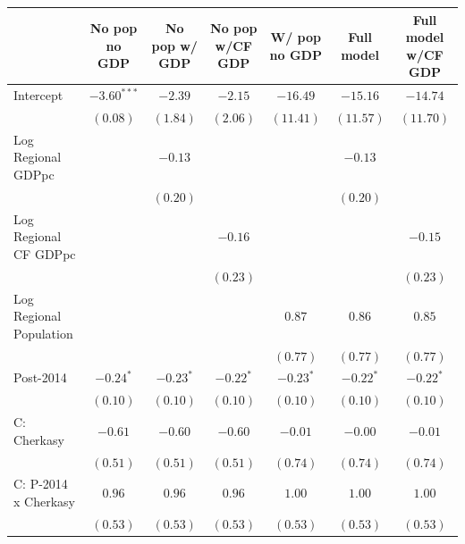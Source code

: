 
\begin{table}
\begin{center}
\begin{small}
\begin{tabular}{l c c c c c c}
\hline
 & No pop
no GDP & No pop
w/ GDP & No pop 
w/CF GDP & W/ pop
no GDP & Full model & Full model w/CF GDP \\
\hline
Intercept                   & $-3.60^{***}$ & $-2.39$       & $-2.15$       & $-16.49$     & $-15.16$     & $-14.74$     \\
                            & $(0.08)$      & $(1.84)$      & $(2.06)$      & $(11.41)$    & $(11.57)$    & $(11.70)$    \\
Log Regional GDPpc          &               & $-0.13$       &               &              & $-0.13$      &              \\
                            &               & $(0.20)$      &               &              & $(0.20)$     &              \\
Log Regional CF GDPpc       &               &               & $-0.16$       &              &              & $-0.15$      \\
                            &               &               & $(0.23)$      &              &              & $(0.23)$     \\
Log Regional Population     &               &               &               & $0.87$       & $0.86$       & $0.85$       \\
                            &               &               &               & $(0.77)$     & $(0.77)$     & $(0.77)$     \\
Post-2014                   & $-0.24^{*}$   & $-0.23^{*}$   & $-0.22^{*}$   & $-0.23^{*}$  & $-0.22^{*}$  & $-0.22^{*}$  \\
                            & $(0.10)$      & $(0.10)$      & $(0.10)$      & $(0.10)$     & $(0.10)$     & $(0.10)$     \\
C: Cherkasy                 & $-0.61$       & $-0.60$       & $-0.60$       & $-0.01$      & $-0.00$      & $-0.01$      \\
                            & $(0.51)$      & $(0.51)$      & $(0.51)$      & $(0.74)$     & $(0.74)$     & $(0.74)$     \\
C: P-2014 x Cherkasy        & $0.96$        & $0.96$        & $0.96$        & $1.00$       & $1.00$       & $1.00$       \\
                            & $(0.53)$      & $(0.53)$      & $(0.53)$      & $(0.53)$     & $(0.53)$     & $(0.53)$     \\

\end{tabular}
\end{small}
\end{center}
\end{table}
